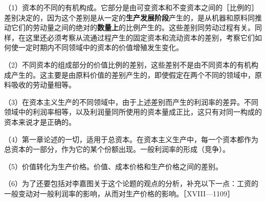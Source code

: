 （1）资本的不同的有机构成。它部分是由可变资本和不变资本之间的［比例的］差别决定的，因为这个差别是从一定的\textbf{生产发展阶段}产生的，是从机器和原料同推动它们的劳动量之间的绝对的\textbf{数量上}的比例产生的。这些差别同劳动过程有关。同样，在这里还必须考察从流通过程产生的固定资本和流动资本的差别，考察它们如何使一定时期内不同领域中的资本的价值增殖发生变化。

（2）不同资本的组成部分的价值比例的差别，这些差别不是由不同资本的有机构成产生的。这主要是由原料价值的差别产生的，即使假定在两个不同的领域中，原料吸收的劳动量相等。

（3）在资本主义生产的不同领域中，由于上述差别而产生的利润率的差异。不同领域中的利润率相等，以及利润量同所使用的资本量成正比，这只有对同一构成的资本来说才是正确的。

（4）第一章论述的一切，适用于总资本。在资本主义生产中，每一个资本都作为总资本的一部分，作为它的某个份额出现。一般利润率的形成（竞争）。

（5）价值转化为生产价格。价值、成本价格和生产价格之间的差别。

（6）为了还要包括对李嘉图关于这个论题的观点的分析，补充以下一点：工资的一般变动对一般利润率的影响，从而对生产价格的影响。［XVIII—1109］
